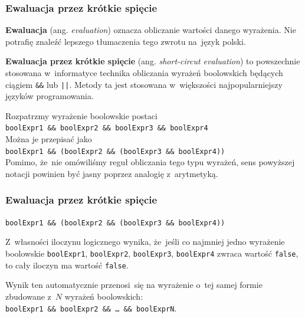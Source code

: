\documentclass[10pt,t]{beamer}
\begin{document}
\begin{frame}
  \frametitle{Ewaluacja przez krótkie spięcie}


  \textbf{Ewaluacja} (ang. \textit{evaluation}) oznacza obliczanie wartości
  danego wyrażenia. Nie potrafię znaleźć lepszego tłumaczenia tego zwrotu
  na~język polski.

  \textbf{Ewaluacja przez krótkie spięcie} (ang. \textit{short-circut
    evaluation}) to powszechnie stosowana w~informatyce technika obliczania
  wyrażeń boolowskich będących ciągiem \texttt{\&\&} lub \texttt{||}.
  Metody ta jest stosowana w~większości najpopularniejszy języków
  programowania.

  Rozpatrzmy wyrażenie boolowskie postaci \\
  \texttt{boolExpr1 \&\& boolExpr2 \&\& boolExpr3 \&\& boolExpr4} \\
  Można je przepisać jako \\
  \texttt{boolExpr1 \&\& (boolExpr2 \&\& (boolExpr3 \&\& boolExpr4))} \\
  Pomimo, że~nie omówiliśmy reguł obliczania tego typu wyrażeń, sens
  powyższej notacji powinien być jasny poprzez analogię z~arytmetyką.

\end{frame}





\begin{frame}
  \frametitle{Ewaluacja przez krótkie spięcie}


  \texttt{boolExpr1 \&\& (boolExpr2 \&\& (boolExpr3 \&\& boolExpr4))}

  Z~własności iloczynu logicznego wynika, że~jeśli co najmniej jedno
  wyrażenie boolowskie \texttt{boolExpr1}, \texttt{boolExpr2},
  \texttt{boolExpr3}, \texttt{boolExpr4} zwraca wartość \texttt{false}, to
  cały iloczyn ma wartość \texttt{false}.

  Wynik ten automatycznie przenosi~się na wyrażenie o~tej samej formie
  zbudowane z~$N$ wyrażeń boolowskich: \\
  \texttt{boolExpr1 \&\& boolExpr2 \&\& \ldots{} \&\& boolExprN}.

\end{frame}
\end{document}
